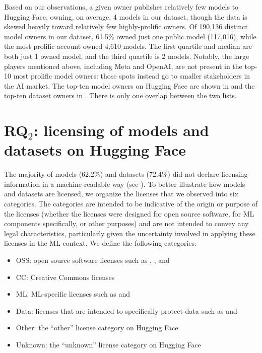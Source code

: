 Based on our observations, %
a given owner publishes relatively few models to Hugging Face, owning, on average, 4 models in our dataset, though the data is skewed heavily toward relatively few highly-prolific owners. Of 190,136 distinct model owners in our dataset, 61.5\% owned just one public model (117,016), while the most prolific account owned 4,610 models. The first quartile and median are both just 1 owned model, and the third quartile is 2 models. Notably, the large players mentioned above, including Meta and OpenAI, are not present in the top-10 most prolific model owners: those spots instead go to smaller stakeholders in the AI market. The top-ten model owners on Hugging Face are shown in  and the top-ten dataset owners in . There is only one overlap between the two lists. 





\section{RQ$_2$: licensing of models and datasets on Hugging Face}
\label{sec:licensing}

The majority of models (62.2\%) and datasets (72.4\%) did not declare licensing information in a machine-readable way (see ). To better illustrate how models and datasets are licensed, we organize the licenses that we observed into six categories. The categories are intended to be indicative of the origin or purpose of the licenses (whether the licenses were designed for open source software, for ML components specifically, or other purposes) and are not intended to convey any legal characteristics, particularly given the uncertainty involved in applying these licenses in the ML context. %
We define the following categories: %
\begin{itemize}
    \item OSS: open source software licenses such as , , and 
    \item CC: Creative Commons licenses
    \item ML: ML-specific licenses such as  and 
    \item Data: licenses that are intended to specifically protect data such as  and 
    \item Other: the ``other'' license category on Hugging Face %
    \item Unknown: the ``unknown'' license category on Hugging Face
\end{itemize}


